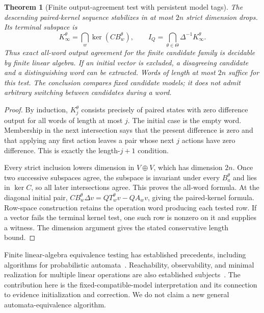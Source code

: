 \documentclass[11pt,letterpaper]{article}
\theoremstyle{plain}
\newtheorem{theorem}{Theorem}[section]
\theoremstyle{definition}
\begin{document}
\begin{theorem}[Finite output-agreement test with persistent model tags]\label{thm:pairtest}
The descending paired-kernel sequence stabilizes in at most $2n$ strict dimension drops. Its terminal subspace is
\[
K_\infty^\theta=\bigcap_w\ker(CB_w^\theta),\qquad
I_Q=\bigcap_{\theta\in\Theta}\Delta^{-1}K_\infty^\theta.
\]
Thus exact all-word output agreement for the finite candidate family is decidable by finite linear algebra. If an initial vector is excluded, a disagreeing candidate and a distinguishing word can be extracted. Words of length at most $2n$ suffice for this test. The conclusion compares fixed candidate models; it does not admit arbitrary switching between candidates during a word.
\end{theorem}
\begin{proof}
By induction, $K_j^\theta$ consists precisely of paired states with zero difference output for all words of length at most $j$. The initial case is the empty word. Membership in the next intersection says that the present difference is zero and that applying any first action leaves a pair whose next $j$ actions have zero difference. This is exactly the length-$j+1$ condition.

Every strict inclusion lowers dimension in $V\oplus V$, which has dimension $2n$. Once two successive subspaces agree, the subspace is invariant under every $B_a^\theta$ and lies in $\ker C$, so all later intersections agree. This proves the all-word formula. At the diagonal initial pair, $CB_w^\theta\Delta v=QT_w^\theta v-QA_wv$, giving the paired-kernel formula. Row-space construction retains the operation word producing each tested row. If a vector fails the terminal kernel test, one such row is nonzero on it and supplies a witness. The dimension argument gives the stated conservative length bound.
\end{proof}

Finite linear-algebra equivalence testing has established precedents, including algorithms for probabilistic automata~\cite{tzeng}. Reachability, observability, and minimal realization for multiple linear operations are also established subjects~\cite{petreczky}. The contribution here is the fixed-compatible-model interpretation and its connection to evidence initialization and correction. We do not claim a new general automata-equivalence algorithm.
\end{document}
